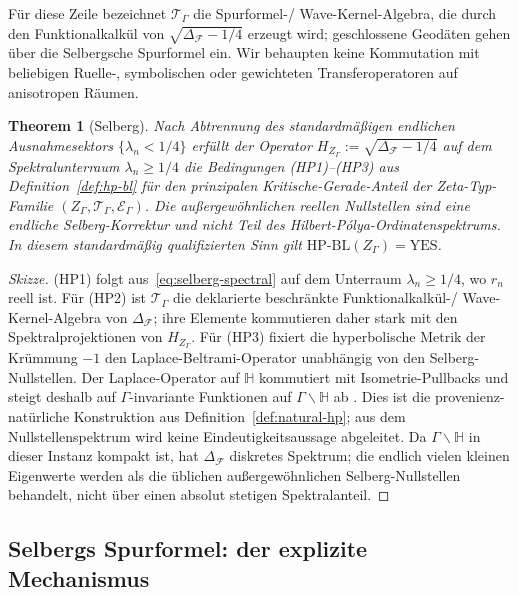 \documentclass[11pt]{article}
\newtheorem{theorem}{Theorem}[section]
\theoremstyle{definition}
\theoremstyle{remark}
\newcommand{\HBL}{\mathrm{HP\text{-}BL}}
\begin{document}
Für diese Zeile bezeichnet $\mathcal{T}_\Gamma$ die Spurformel-/
Wave-Kernel-Algebra, die durch den Funktionalkalkül von
$\sqrt{\Delta_\mathcal{F}-1/4}$ erzeugt wird; geschlossene Geodäten gehen
über die Selbergsche Spurformel ein. Wir behaupten keine Kommutation mit
beliebigen Ruelle-, symbolischen oder gewichteten Transferoperatoren auf
anisotropen Räumen.

\begin{theorem}[Selberg]\label{thm:selberg-hp}
Nach Abtrennung des standardmäßigen endlichen Ausnahmesektors
$\{\lambda_n<1/4\}$ erfüllt der Operator
$H_{Z_\Gamma}:=\sqrt{\Delta_\mathcal{F}-1/4}$ auf dem Spektralunterraum
$\lambda_n\geq 1/4$ die Bedingungen (HP1)--(HP3) aus
Definition~\ref{def:hp-bl} für den prinzipalen Kritische-Gerade-Anteil
der Zeta-Typ-Familie
$(Z_\Gamma, \mathcal{T}_\Gamma, \mathcal{E}_\Gamma)$. Die
außergewöhnlichen reellen Nullstellen sind eine endliche Selberg-Korrektur
und nicht Teil des Hilbert-P\'olya-Ordinatenspektrums. In diesem
standardmäßig qualifizierten Sinn gilt $\HBL(Z_\Gamma)=\mathrm{YES}$.
\end{theorem}

\begin{proof}[Skizze]
(HP1) folgt aus~\eqref{eq:selberg-spectral} auf dem Unterraum
$\lambda_n\geq 1/4$, wo $r_n$ reell ist. Für (HP2) ist
$\mathcal{T}_\Gamma$ die deklarierte beschränkte Funktionalkalkül-/
Wave-Kernel-Algebra von $\Delta_\mathcal{F}$; ihre Elemente kommutieren
daher stark mit den Spektralprojektionen von $H_{Z_\Gamma}$. Für (HP3)
fixiert die hyperbolische Metrik der Krümmung $-1$ den
Laplace-Beltrami-Operator unabhängig von den Selberg-Nullstellen. Der
Laplace-Operator auf $\mathbb{H}$ kommutiert mit Isometrie-Pullbacks und
steigt deshalb auf $\Gamma$-invariante Funktionen auf
$\Gamma\backslash\mathbb{H}$ ab \cite{Marklof2008}. Dies ist die
provenienz-natürliche Konstruktion aus Definition~\ref{def:natural-hp};
aus dem Nullstellenspektrum wird keine Eindeutigkeitsaussage abgeleitet.
Da $\Gamma\backslash\mathbb{H}$ in dieser Instanz kompakt ist, hat
$\Delta_\mathcal{F}$ diskretes Spektrum; die endlich vielen kleinen
Eigenwerte werden als die üblichen außergewöhnlichen Selberg-Nullstellen
behandelt, nicht über einen absolut stetigen Spektralanteil.
\end{proof}

\subsection{Selbergs Spurformel: der explizite Mechanismus}
\label{sec:selberg-trace}
\end{document}
